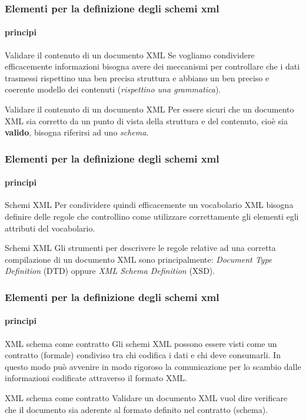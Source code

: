 \begin{frame}
    \frametitle{Elementi per la definizione degli schemi xml}
    \framesubtitle{principi}
    \addtocounter{nframe}{1}

    \begin{block}{Validare il contenuto di un documento XML}
        Se vogliamo condividere efficacemente informazioni bisogna avere dei meccanismi per controllare che i dati trasmessi rispettino una ben precisa struttura e abbiano un ben preciso e coerente modello dei contenuti (\textit{rispettino una grammatica}).
    \end{block}
   
    \begin{block}{Validare il contenuto di un documento XML}
       Per essere sicuri che un documento XML sia corretto da un punto di vista della struttura e del contenuto, cioè sia \textbf{valido}, bisogna riferirsi ad uno \textit{schema}.
    \end{block}


\end{frame}


\begin{frame}
    \frametitle{Elementi per la definizione degli schemi xml}
    \framesubtitle{principi}
    \addtocounter{nframe}{1}

    \begin{block}{Schemi XML}
        Per condividere quindi efficacemente un vocabolario XML bisogna definire delle regole che controllino come utilizzare correttamente gli elementi egli attributi del vocabolario.
    \end{block}
   
    \begin{block}{Schemi XML}
        Gli strumenti per descrivere le regole relative ad una corretta compilazione di un documento XML sono principalmente: \textit{Document Type Definition} (DTD) oppure \textit{XML Schema Definition} (XSD).
    \end{block}


\end{frame}

\begin{frame}
    \frametitle{Elementi per la definizione degli schemi xml}
    \framesubtitle{principi}
    \addtocounter{nframe}{1}
    \begin{block}{XML schema come contratto} 
        Gli schemi XML possono essere visti come un contratto (formale) condiviso tra chi codifica i dati e chi deve consumarli. In questo modo può avvenire in modo rigoroso la comunicazione per lo scambio dalle informazioni codificate attraverso il formato XML.
    \end{block}
    
    \begin{block}{XML schema come contratto} 
        Validare un documento XML vuol dire verificare che il documento sia aderente al formato definito nel contratto (schema).
    \end{block}

\end{frame}

